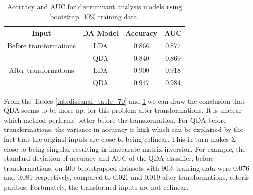 \documentclass[../../project.tex]{subfiles}
\begin{document}
		\begin{table}[h!]
		\centering
		\begin{tabular}{cccc}
			Input & DA Model & Accuracy & AUC \\
			\midrule
			Before transformations
			& LDA & 0.866 & 0.877 \\
		    & QDA & 0.840 & 0.869 \\
			\midrule
			After transformations
			& LDA & 0.900 & 0.918 \\
			& QDA & 0.947 & 0.984 \\
		\end{tabular}
		\caption{Accuracy and AUC for discriminant analysis models using bootstrap. 90\% training data.}
		\label{tab:discanal_table_90}
	\end{table}
	From the Tables \ref{tab:discanal_table_70} and \ref{tab:discanal_table_90} we can draw the conclusion that QDA seems to be more apt for this problem after transformations. It is unclear which method performs better before the transformation. For QDA before transformations, the variance in accuracy is high which can be explained by the fact that the original inputs are close to being colinear. This in turn makes $\Sigma$ close to being singular resulting in inaccurate matrix inversion. For example, the standard deviation of accuracy and AUC of the QDA classifier, before transformations, on 400 bootstrapped datasets with 90\% training data were 0.076 and 0.081 respectively, compared to 0.021 and 0.019 after transformations, ceteris paribus. Fortunately, the transformed inputs are not colinear.
	
\end{document}
